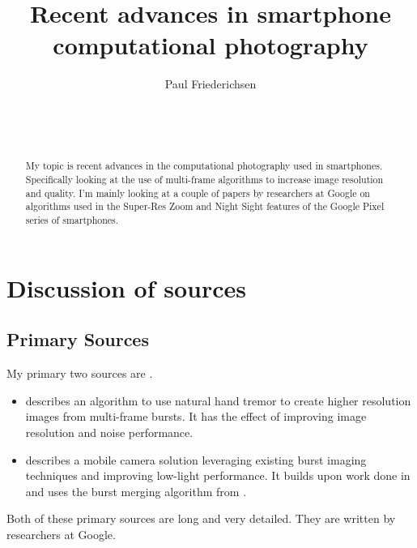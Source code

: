 \documentclass{sig-alternate}
\begin{document}

\title{Recent advances in smartphone computational photography}


\author{
\alignauthor
Paul Friederichsen\\
	\\
	\\
	\\
}

\maketitle

\begin{abstract}
My topic is recent advances in the computational photography used in smartphones. Specifically looking at the use of multi-frame algorithms to increase image resolution and quality. I'm mainly looking at a couple of papers by researchers at Google on algorithms used in the Super-Res Zoom and Night Sight features of the Google Pixel series of smartphones.
\end{abstract}

\section{Discussion of sources}


\subsection{Primary Sources}

My primary two sources are \cite{Wronski2019, Liba2019}.
\begin{itemize}
\item \cite{Wronski2019} describes an algorithm to use natural hand tremor to create higher resolution images from multi-frame bursts. It has the effect of improving image resolution and noise performance.

\item \cite{Liba2019} describes a mobile camera solution leveraging existing burst imaging techniques and improving low-light performance. It builds upon work done in \cite{Hasinoff2016} and uses the burst merging algorithm from \cite{Wronski2019}.
\end{itemize}
Both of these primary sources are long and very detailed. They are written by researchers at Google.
\end{document}
